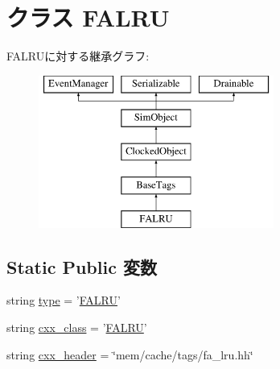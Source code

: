 \hypertarget{classTags_1_1FALRU}{
\section{クラス FALRU}
\label{classTags_1_1FALRU}
}
FALRUに対する継承グラフ:\begin{figure}[H]
\begin{center}
\leavevmode
\includegraphics[height=5cm]{classTags_1_1FALRU}
\end{center}
\end{figure}
\subsection*{Static Public 変数}
\begin{DoxyCompactItemize}
\item 
string \hyperlink{classTags_1_1FALRU_acce15679d830831b0bbe8ebc2a60b2ca}{type} = '\hyperlink{classTags_1_1FALRU}{FALRU}'
\item 
string \hyperlink{classTags_1_1FALRU_a58cd55cd4023648e138237cfc0822ae3}{cxx\_\-class} = '\hyperlink{classTags_1_1FALRU}{FALRU}'
\item 
string \hyperlink{classTags_1_1FALRU_a17da7064bc5c518791f0c891eff05fda}{cxx\_\-header} = \char`\"{}mem/cache/tags/fa\_\-lru.hh\char`\"{}
\end{DoxyCompactItemize}


